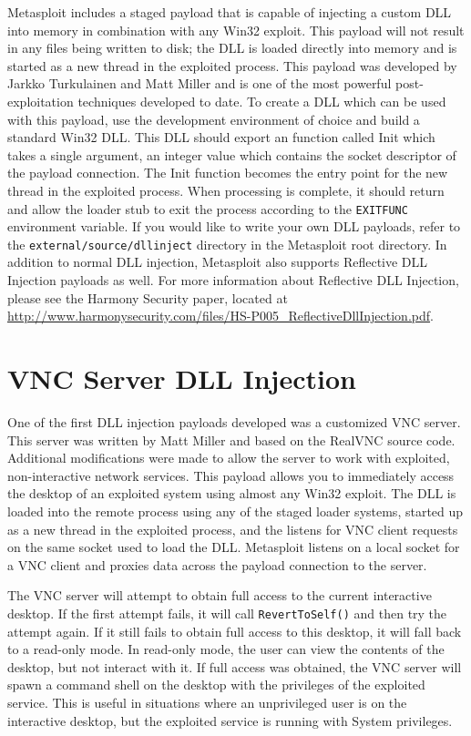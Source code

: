 \documentclass{report}
\begin{document}
\par
Metasploit includes a staged payload that is capable of injecting a custom
DLL into memory in combination with any Win32 exploit. This payload will not
result in any files being written to disk; the DLL is loaded directly into
memory and is started as a new thread in the exploited process. This payload was
developed by Jarkko Turkulainen and Matt Miller and is one of the most powerful
post-exploitation techniques developed to date. To create a DLL which can be
used with this payload, use the development environment of choice and build a
standard Win32 DLL. This DLL should export an function called Init which takes a
single argument, an integer value which contains the socket descriptor of the
payload connection. The Init function becomes the entry point for the new thread
in the exploited process. When processing is complete, it should return and
allow the loader stub to exit the process according to the \texttt{EXITFUNC}
environment variable. If you would like to write your own DLL payloads, refer to
the \texttt{external/source/dllinject} directory in the Metasploit root
directory. In addition to normal DLL injection, Metasploit also supports
Reflective DLL Injection payloads as well. For more information about Reflective
DLL Injection, please see the Harmony Security paper, located at
\url{http://www.harmonysecurity.com/files/HS-P005\_ReflectiveDllInjection.pdf}.

\section{VNC Server DLL Injection}

\par
One of the first DLL injection payloads developed was a customized VNC server.
This server was written by Matt Miller and based on the RealVNC source code.
Additional modifications were made to allow the server to work with exploited,
non-interactive network services. This payload allows you to immediately access
the desktop of an exploited system using almost any Win32 exploit. The DLL is
loaded into the remote process using any of the staged loader systems, started
up as a new thread in the exploited process, and the listens for VNC client
requests on the same socket used to load the DLL. Metasploit listens on a local
socket for a VNC client and proxies data across the payload connection to the
server.

\par
The VNC server will attempt to obtain full access to the current interactive
desktop. If the first attempt fails, it will call \texttt{RevertToSelf()} and
then try the attempt again. If it still fails to obtain full access to this
desktop, it will fall back to a read-only mode. In read-only mode, the user can
view the contents of the desktop, but not interact with it. If full access was
obtained, the VNC server will spawn a command shell on the desktop with the
privileges of the exploited service. This is useful in situations where an
unprivileged user is on the interactive desktop, but the exploited service is
running with System privileges.
\end{document}
